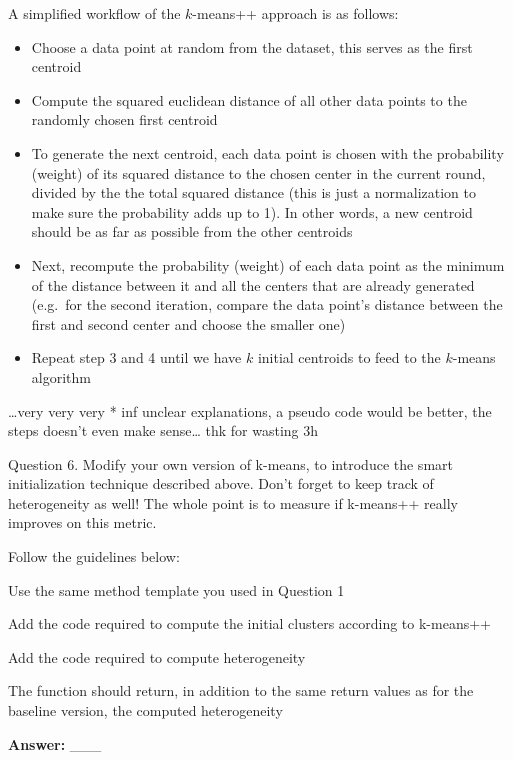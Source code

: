 \documentclass[11pt]{article}
\providecommand{\tightlist}{%
      \setlength{\itemsep}{0pt}\setlength{\parskip}{0pt}}
\begin{document}
A simplified workflow of the \(k\)-means++ approach is as follows:

\begin{itemize}
\tightlist
\item
  Choose a data point at random from the dataset, this serves as the
  first centroid
\item
  Compute the squared euclidean distance of all other data points to the
  randomly chosen first centroid
\item
  To generate the next centroid, each data point is chosen with the
  probability (weight) of its squared distance to the chosen center in
  the current round, divided by the the total squared distance (this is
  just a normalization to make sure the probability adds up to 1). In
  other words, a new centroid should be as far as possible from the
  other centroids
\item
  Next, recompute the probability (weight) of each data point as the
  minimum of the distance between it and all the centers that are
  already generated (e.g.~for the second iteration, compare the data
  point's distance between the first and second center and choose the
  smaller one)
\item
  Repeat step 3 and 4 until we have \(k\) initial centroids to feed to
  the \(k\)-means algorithm
\end{itemize}

\ldots{}very very very * inf unclear explanations, a pseudo code would
be better, the steps doesn't even make sense\ldots{} thk for wasting 3h

    Question 6. Modify your own version of k-means, to introduce the smart
initialization technique described above. Don't forget to keep track of
heterogeneity as well! The whole point is to measure if k-means++ really
improves on this metric.

Follow the guidelines below:

Use the same method template you used in Question 1

Add the code required to compute the initial clusters according to
k-means++

Add the code required to compute heterogeneity

The function should return, in addition to the same return values as for
the baseline version, the computed heterogeneity

    \textbf{Answer:} \_\_\_
\end{document}
